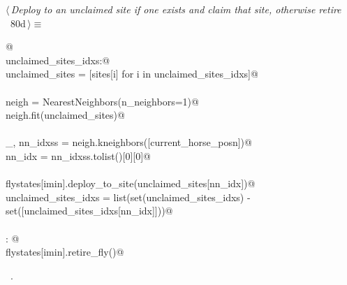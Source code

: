 \documentclass[11.5pt]{report}
\begin{document}
\vspace{-0.8cm} \newchunk
\begin{flushleft} \small
\begin{minipage}{\linewidth}\label{scrap126}\raggedright\small
{} $\langle\,${\itshape Deploy  to an unclaimed site if one exists and claim that site, otherwise retire }\nobreak\ {\footnotesize {80d}}$\,\rangle\equiv$
\vspace{-1ex}
\begin{list}{}{} \item
\mbox{}\verb@  @\\
\mbox{}\verb@if  unclaimed_sites_idxs:@\\
\mbox{}\verb@    unclaimed_sites = [sites[i] for i in unclaimed_sites_idxs]@\\
\mbox{}\verb@@\\
\mbox{}\verb@    neigh = NearestNeighbors(n_neighbors=1)@\\
\mbox{}\verb@    neigh.fit(unclaimed_sites)@\\
\mbox{}\verb@@\\
\mbox{}\verb@    _, nn_idxss = neigh.kneighbors([current_horse_posn])@\\
\mbox{}\verb@    nn_idx      = nn_idxss.tolist()[0][0]@\\
\mbox{}\verb@@\\
\mbox{}\verb@    flystates[imin].deploy_to_site(unclaimed_sites[nn_idx])@\\
\mbox{}\verb@    unclaimed_sites_idxs = list(set(unclaimed_sites_idxs) - \@\\
\mbox{}\verb@                                set([unclaimed_sites_idxs[nn_idx]]))@\\
\mbox{}\verb@@\\
\mbox{}\verb@else: @\\
\mbox{}\verb@    flystates[imin].retire_fly()@\\
\mbox{}\verb@@{\NWsep}
\end{list}
\vspace{-1.5ex}
\footnotesize
\begin{list}{}{\setlength{\itemsep}{-\parsep}\setlength{\itemindent}{-\leftmargin}}
\item \NWtxtMacroRefIn\ .

\item{}
\end{list}
\end{minipage}\vspace{4ex}
\end{flushleft}
\end{document}
